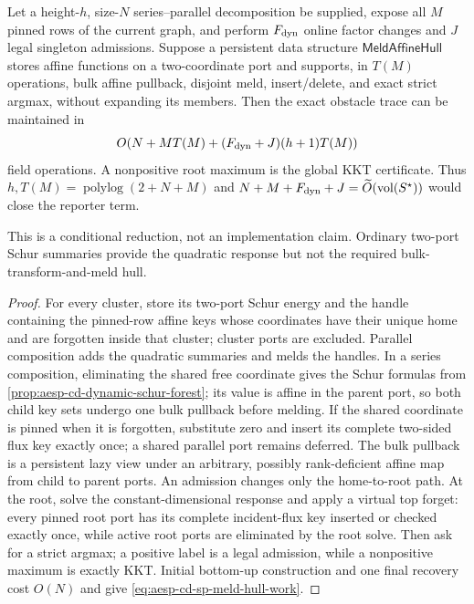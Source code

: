 \begin{proposition}
\label{prop:aesp-cd-sp-meld-hull-reduction}
Let a height-$h$, size-$N$ series--parallel decomposition be supplied, expose
all $M$ pinned rows of the current graph, and perform $F_{\rm dyn}$ online factor
changes and $J$ legal
singleton admissions.  Suppose a persistent data structure
$\mathsf{MeldAffineHull}$ stores affine functions on a two-coordinate port
and supports, in $T(M)$ operations, bulk affine pullback, disjoint meld,
insert/delete, and exact strict argmax, without expanding its members.  Then
the exact obstacle trace can be maintained in
\begin{equation}
 O\!\left(N+MT(M)+(F_{\rm dyn}+J)(h+1)T(M)\right)
 \label{eq:aesp-cd-sp-meld-hull-work}
\end{equation}
field operations.  A nonpositive root maximum is the global KKT certificate.
Thus $h,T(M)=\operatorname{polylog}(2+N+M)$ and
$N+M+F_{\rm dyn}+J=\widetilde O(\operatorname{vol}(S^\star))$ would close the reporter term.

This is a conditional reduction, not an implementation claim.  Ordinary
two-port Schur summaries provide the quadratic response but not the required
bulk-transform-and-meld hull.
\end{proposition}

\begin{proof}
For every cluster, store its two-port Schur energy and the handle containing
the pinned-row affine keys whose coordinates have their unique home and are
forgotten inside that cluster; cluster ports are excluded.  Parallel
composition adds the quadratic summaries and melds the handles.  In a series
composition, eliminating the shared free coordinate gives the Schur formulas
from \cref{prop:aesp-cd-dynamic-schur-forest}; its value is affine in the
parent port, so both child key sets undergo one bulk pullback before melding.
If the shared coordinate is pinned when it is forgotten, substitute zero and
insert its complete two-sided flux key exactly once; a shared parallel port
remains deferred.  The bulk pullback is a persistent lazy view under an
arbitrary, possibly rank-deficient affine map from child to parent ports.
An admission changes only the home-to-root path.  At the root, solve the
constant-dimensional response and apply a virtual top forget: every pinned
root port has its complete incident-flux key inserted or checked exactly once,
while active root ports are eliminated by the root solve.  Then ask for a
strict argmax; a positive label is a legal admission, while a nonpositive
maximum is exactly KKT.  Initial bottom-up construction and one final recovery
cost $O(N)$ and give
\cref{eq:aesp-cd-sp-meld-hull-work}.
\end{proof}

